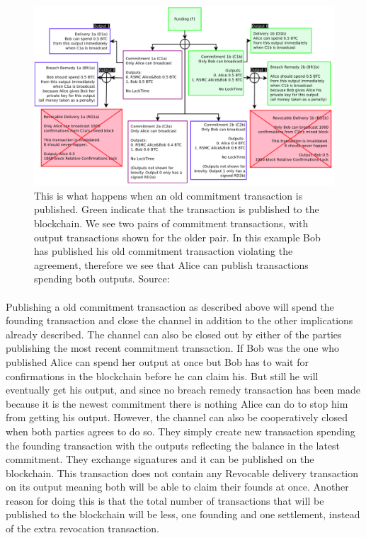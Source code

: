 \documentclass[informationsecurity]{gucmasterproject}
\begin{document}
\begin{figure}[h]
    \centering
    \includegraphics[width=14cm]{figs/ln_breach.png}
    \caption{This is what happens when an old commitment transaction is published. Green indicate that the transaction is published to the blockchain. We see two pairs of commitment transactions, with output transactions shown for the older pair. In this example Bob has published his old commitment transaction violating the agreement, therefore we see that Alice can publish transactions spending both outputs. Source: \cite{poon2015bitcoin}}
    \label{fig:ln_breach}
\end{figure}

\paragraph{}
Publishing a old commitment transaction as described above will spend the founding transaction and close the channel in addition to the other implications already described.
The channel can also be closed out by either of the parties publishing the most recent commitment transaction. If Bob was the one who published Alice can spend her output at once but Bob has to wait for confirmations in the blockchain before he can claim his. But still he will eventually get his output, and since no breach remedy transaction has been made because it is the newest commitment there is nothing Alice can do to stop him from getting his output.
However, the channel can also be cooperatively closed when both parties agrees to do so. They simply create new transaction spending the founding transaction with the outputs reflecting the balance in the latest commitment. They exchange signatures and it can be published on the blockchain. This transaction does not contain any Revocable delivery transaction on its output meaning both will be able to claim their founds at once. 
Another reason for doing this is that the total number of transactions that will be published to the blockchain will be less, one founding and one settlement, instead of the extra revocation transaction.
\end{document}
